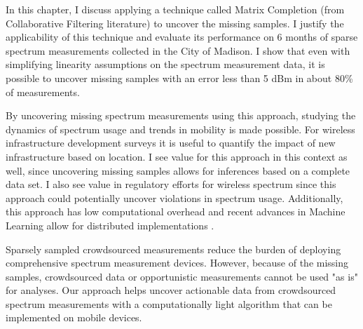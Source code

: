 In this chapter, I discuss applying a technique called Matrix Completion \cite{CandesRecht} (from Collaborative Filtering literature) to uncover the missing samples.
 I justify the applicability of this technique and evaluate its performance on 6 months of sparse spectrum measurements collected in the City of Madison.
 I show that even with simplifying linearity assumptions on the spectrum measurement data, it is possible to uncover missing samples with an error less than 5 dBm in about 80\% of measurements.

By uncovering missing spectrum measurements using this approach, studying the dynamics of spectrum usage and trends in mobility is made possible.
 For wireless infrastructure development surveys it is useful to quantify the impact of new infrastructure based on location.
 I see value for this approach in this context as well, since uncovering missing samples allows for inferences based on a complete data set.
 I also see value in regulatory efforts for wireless spectrum since this approach could potentially uncover violations in spectrum usage.
 Additionally, this approach has low computational overhead and recent advances in Machine Learning allow for distributed implementations \cite{Hogwild} \cite{Cyclades}.

Sparsely sampled crowdsourced measurements reduce the burden of deploying comprehensive spectrum measurement devices.
 However, because of the missing samples, crowdsourced data or opportunistic measurements cannot be used "as is" for analyses.
 Our approach helps uncover actionable data from crowdsourced spectrum measurements \cite{WiSee} with a computationally light algorithm that can be implemented on mobile devices.
